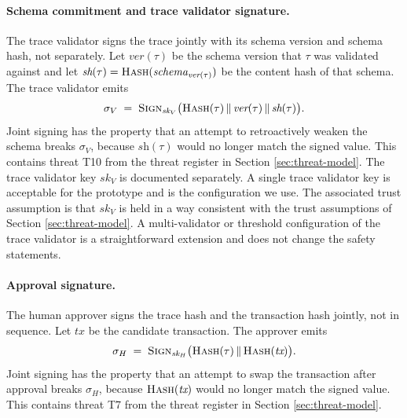 \paragraph{Schema commitment and trace validator signature.}
The trace validator signs the trace jointly with its schema version and schema hash, not separately. Let $\textit{ver}(\tau)$ be the schema version that $\tau$ was validated against and let $\textit{sh}(\tau) = \textsc{Hash}(\textit{schema}_{\textit{ver}(\tau)})$ be the content hash of that schema. The trace validator emits
\[
\sigma_V \;=\; \textsc{Sign}_{\textit{sk}_V}\bigl(\textsc{Hash}(\tau)\,\|\,\textit{ver}(\tau)\,\|\,\textit{sh}(\tau)\bigr).
\]
Joint signing has the property that an attempt to retroactively weaken the schema breaks $\sigma_V$, because $\textit{sh}(\tau)$ would no longer match the signed value. This contains threat T10 from the threat register in Section \ref{sec:threat-model}. The trace validator key $\textit{sk}_V$ is documented separately. A single trace validator key is acceptable for the prototype and is the configuration we use. The associated trust assumption is that $\textit{sk}_V$ is held in a way consistent with the trust assumptions of Section \ref{sec:threat-model}. A multi-validator or threshold configuration of the trace validator is a straightforward extension and does not change the safety statements.

\paragraph{Approval signature.}
The human approver signs the trace hash and the transaction hash jointly, not in sequence. Let $\textit{tx}$ be the candidate transaction. The approver emits
\[
\sigma_H \;=\; \textsc{Sign}_{\textit{sk}_H}\bigl(\textsc{Hash}(\tau)\,\|\,\textsc{Hash}(\textit{tx})\bigr).
\]
Joint signing has the property that an attempt to swap the transaction after approval breaks $\sigma_H$, because $\textsc{Hash}(\textit{tx})$ would no longer match the signed value. This contains threat T7 from the threat register in Section \ref{sec:threat-model}.

